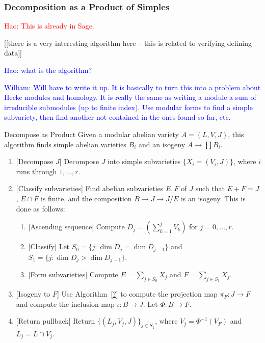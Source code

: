 \documentclass{article}
\newcommand{\Hao}[1]{\textcolor{blue}{\textsf{Hao: #1}}}
\newcommand{\wstein}[1]{\textcolor{blue}{\textsf{William: #1}}}
\newcommand{\Haonew}[1]{\textcolor{red}{\textsf{Hao: #1}}}
\begin{document}
\subsubsection{Decomposition as a Product of Simples}



\Haonew{This is already in Sage.}

[[there is a very interesting algorithm here -- this is related
to verifying defining data]]

\Hao{what is the algorithm?}

\wstein{Will have to write it up.  It is basically to turn this into a problem about Hecke modules and homology.  It is really the same as
writing a module a sum of irreducible submodules (up to finite index).
Use modular forms to find a simple subvariety, then find another not
contained in the ones found so far, etc.}


\begin{algorithm}{Decompose as Product}
    Given a modular abelian variety $A=(L, V, J)$, this algorithm finds simple
    abelian varieties $B_i$ and an isogeny $A\to \prod B_i$.
    \begin{enumerate}
        \item{} [Decompose $J$]
            Decompose $J$ into simple subvarieties $\{X_i=(V_i, J)\}$, where
            $i$ runs through $1,\ldots,r$.
        \item{} [Classify subvarieties]
            Find abelian subvarieties $E, F$ of $J$ such that $E+F=J$, $E\cap
            F$ is finite, and the composition $B \to J \to J/E$ is an isogeny.
            This is done as follows:
            \begin{enumerate}
                \item{} [Ascending sequence]
                    Compute $D_j = \left(\sum_{k=1} ^j V_k \right)$ for $j=0,\ldots,r$.
                \item{} [Classify]
                    Let $S_0 = \{j: \dim D_j = \dim D_{j-1}\}$ and $S_1 = \{j:
                    \dim D_j > \dim D_{j-1}\}$.
                \item{} [Form subvarieties]
                    Compute $E = \sum_{j \in S_0} X_j$ and $F = \sum_{j\in S_1}
                    X_j$.
            \end{enumerate}
        \item{} [Isogeny to $F$]
            Use Algorithm~\ref{?} to compute the projection map $\pi_F:J \to F$
            and compute the inclusion map $\iota:B \to J$. Let $\Phi:B\to F$. 
        \item{} [Return pullback]
            Return $\{(L_j, V_j, J)\}_{j\in S_1}$, where $V_j =
            \Phi^{-1}(V_F)$ and $L_j = L\cap V_j$.
    \end{enumerate}
\end{algorithm}
\end{document}
